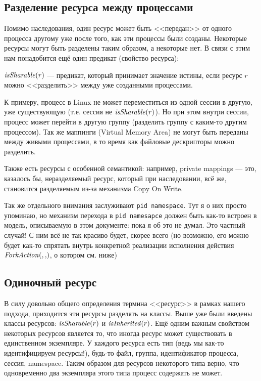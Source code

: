 \subsection{Разделение ресурса между процессами}
\label{subsec:shareres}

Помимо наследования, один ресурс может быть <<передан>> от одного процесса другому уже после того, как эти процессы были созданы. Некоторые ресурсы могут быть разделены таким образом, а некоторые нет. В связи с этим нам понадобится ещё один предикат (свойство ресурса):

\begin{defn}
\label{def:issharable}
$\text{\textit{isSharable}}(r)$ --- предикат, который принимает значение истины, если ресурс $r$ можно <<разделить>> между уже созданными процессами.
\end{defn}

\begin{exmp}
К примеру, процесс в Linux не может переместиться из одной сессии в другую, уже существующую (т.е. сессия не $\text{\textit{isSharable}}(r)$). Но при этом внутри сессии, процесс может перейти в другую группу (разделить группу с каким-то другим процессом). Так же маппинги (Virtual Memory Area) не могут быть переданы между живыми процессами, в то время как файловые дескрипторы можно разделить.
\end{exmp}

Также есть ресурсы с особенной семантикой: например, private mappings --- это, казалось бы, неразделяемый ресурс, который при наследовании, всё же, становится разделяемым из-за механизма Copy On Write.

\begin{note}
Так же отдельного внимания заслуживают \texttt{pid namespace}. Тут я о них просто упоминаю, но механизм перехода в \texttt{pid namesapce} должен быть как-то встроен в модель, описываемую в этом документе: пока я об это не думал. Это частный случай! С ним всё не так красиво будет, скорее всего (но возможно, его можно будет как-то спрятать внутрь конкретной реализации исполнения действия $\crfork{}{}$, о котором см. ниже)
\end{note}

\subsection{Одиночный ресурс}

В силу довольно общего определения термина <<ресурс>> в рамках нашего подхода, приходится эти ресурсы разделять на классы. Выше уже были введены классы ресурсов: $\text{\textit{isSharable}}(r)$ и $\text{\textit{isInherited}}(r)$. Ещё одним важным свойством некоторых ресурсов является то, что иногда ресурс может существовать в единственном экземпляре. У каждого ресурса есть тип (ведь мы как-то идентифицируем ресурсы!), будь-то файл, группа, идентификатор процесса, сессия, namespace. Таким образом для ресурсов некоторого типа верно, что одновременно два экземпляра этого типа процесс содержать не может.

